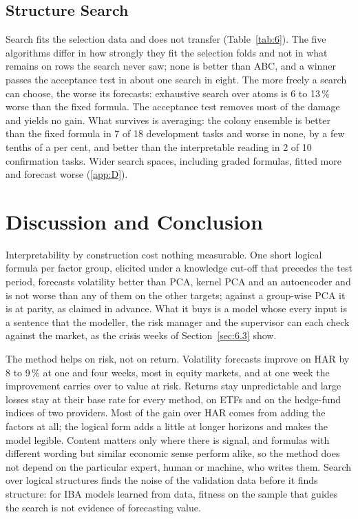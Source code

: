 \documentclass[review]{elsarticle}
\begin{document}
\subsection{Structure Search}\label{sec:6.5}



Search fits the selection data and does not transfer (Table~\ref{tab:6}). The five algorithms differ in how strongly they fit the selection folds and not in what remains on rows the search never saw; none is better than ABC, and a winner passes the acceptance test in about one search in eight. The more freely a search can choose, the worse its forecasts: exhaustive search over atoms is 6 to 13\,\% worse than the fixed formula. The acceptance test removes most of the damage and yields no gain. What survives is averaging: the colony ensemble is better than the fixed formula in 7 of 18 development tasks and worse in none, by a few tenths of a per cent, and better than the interpretable reading in 2 of 10 confirmation tasks. Wider search spaces, including graded formulas, fitted more and forecast worse (\ref{app:D}).

\section{Discussion and Conclusion}\label{sec:7}

Interpretability by construction cost nothing measurable. One short logical formula per factor group, elicited under a knowledge cut-off that precedes the test period, forecasts volatility better than PCA, kernel PCA and an autoencoder and is not worse than any of them on the other targets; against a group-wise PCA it is at parity, as claimed in advance. What it buys is a model whose every input is a sentence that the modeller, the risk manager and the supervisor can each check against the market, as the crisis weeks of Section~\ref{sec:6.3} show.

The method helps on risk, not on return. Volatility forecasts improve on HAR by 8 to 9\,\% at one and four weeks, most in equity markets, and at one week the improvement carries over to value at risk. Returns stay unpredictable and large losses stay at their base rate for every method, on ETFs and on the hedge-fund indices of two providers. Most of the gain over HAR comes from adding the factors at all; the logical form adds a little at longer horizons and makes the model legible. Content matters only where there is signal, and formulas with different wording but similar economic sense perform alike, so the method does not depend on the particular expert, human or machine, who writes them. Search over logical structures finds the noise of the validation data before it finds structure: for IBA models learned from data, fitness on the sample that guides the search is not evidence of forecasting value.
\end{document}
